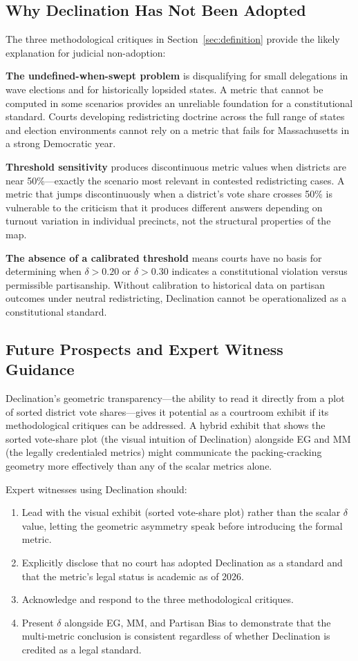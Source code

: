 \subsection{Why Declination Has Not Been Adopted}

The three methodological critiques in Section~\ref{sec:definition} provide the
likely explanation for judicial non-adoption:

\textbf{The undefined-when-swept problem} is disqualifying for small delegations
in wave elections and for historically lopsided states. A metric that cannot be
computed in some scenarios provides an unreliable foundation for a constitutional
standard. Courts developing redistricting doctrine across the full range of states
and election environments cannot rely on a metric that fails for Massachusetts in
a strong Democratic year.

\textbf{Threshold sensitivity} produces discontinuous metric values when districts
are near 50\%---exactly the scenario most relevant in contested redistricting cases.
A metric that jumps discontinuously when a district's vote share crosses 50\% is
vulnerable to the criticism that it produces different answers depending on turnout
variation in individual precincts, not the structural properties of the map.

\textbf{The absence of a calibrated threshold} means courts have no basis for
determining when $\delta > 0.20$ or $\delta > 0.30$ indicates a constitutional
violation versus permissible partisanship. Without calibration to historical
data on partisan outcomes under neutral redistricting, Declination cannot be
operationalized as a constitutional standard.

\subsection{Future Prospects and Expert Witness Guidance}

Declination's geometric transparency---the ability to read it directly from
a plot of sorted district vote shares---gives it potential as a courtroom
exhibit if its methodological critiques can be addressed. A hybrid exhibit
that shows the sorted vote-share plot (the visual intuition of Declination)
alongside EG and MM (the legally credentialed metrics) might communicate the
packing-cracking geometry more effectively than any of the scalar metrics alone.

Expert witnesses using Declination should:
\begin{enumerate}
\item Lead with the visual exhibit (sorted vote-share plot) rather than the
  scalar $\delta$ value, letting the geometric asymmetry speak before introducing
  the formal metric.
\item Explicitly disclose that no court has adopted Declination as a standard
  and that the metric's legal status is academic as of 2026.
\item Acknowledge and respond to the three methodological critiques.
\item Present $\delta$ alongside EG, MM, and Partisan Bias to demonstrate
  that the multi-metric conclusion is consistent regardless of whether
  Declination is credited as a legal standard.
\end{enumerate}
